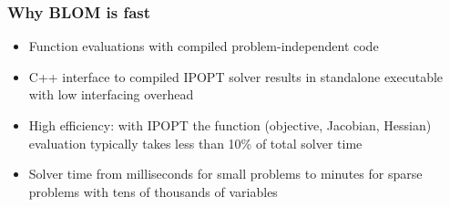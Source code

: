 \documentclass[mathserif]{beamer}
\begin{document}
\begin{frame}
\frametitle{Why BLOM is fast}
\begin{itemize}
\item Function evaluations with compiled problem-independent  code
\item C++ interface to compiled IPOPT solver 
results in standalone executable with low interfacing overhead
\item High efficiency: with IPOPT the function (objective, Jacobian, Hessian) evaluation typically takes less than 10\% of total solver time
\item Solver time from milliseconds for small problems to minutes for sparse problems with tens of thousands of variables
\end{itemize}

\end{frame}
\end{document}
